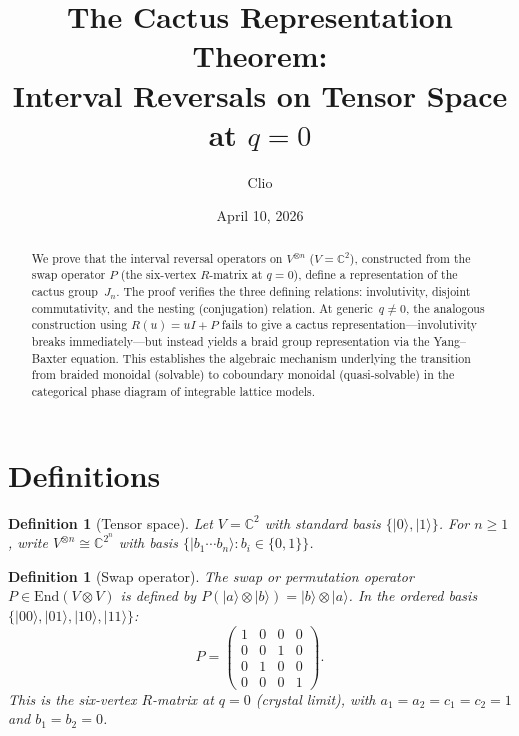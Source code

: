 \documentclass[11pt]{article}
\title{The Cactus Representation Theorem:\\
  Interval Reversals on Tensor Space at $q=0$}
\author{Clio}
\date{April 10, 2026}
\newtheorem{definition}[theorem]{Definition}
\theoremstyle{remark}
\newcommand{\CC}{\mathbb{C}}
\newcommand{\ket}[1]{|#1\rangle}
\begin{document}
\maketitle

\begin{abstract}
We prove that the interval reversal operators on $V^{\otimes n}$
($V = \CC^2$), constructed from the swap operator $P$ (the six-vertex
$R$-matrix at $q = 0$), define a representation of the cactus group~$J_n$.
The proof verifies the three defining relations: involutivity,
disjoint commutativity, and the nesting (conjugation) relation.
At generic~$q \neq 0$, the analogous construction using $R(u) = uI + P$
fails to give a cactus representation---involutivity breaks immediately---but
instead yields a braid group representation via the Yang--Baxter equation.
This establishes the algebraic mechanism underlying the transition from
braided monoidal (solvable) to coboundary monoidal (quasi-solvable) in
the categorical phase diagram of integrable lattice models.
\end{abstract}

\section{Definitions}

\begin{definition}[Tensor space]
Let $V = \CC^2$ with standard basis $\{\ket{0}, \ket{1}\}$.
For $n \geq 1$, write $V^{\otimes n} \cong \CC^{2^n}$ with basis
$\{\ket{b_1 \cdots b_n} : b_i \in \{0,1\}\}$.
\end{definition}

\begin{definition}[Swap operator]\label{def:swap}
The \emph{swap} or \emph{permutation} operator $P \in \mathrm{End}(V \otimes V)$
is defined by $P(\ket{a} \otimes \ket{b}) = \ket{b} \otimes \ket{a}$.
In the ordered basis $\{\ket{00}, \ket{01}, \ket{10}, \ket{11}\}$:
\[
  P = \begin{pmatrix}
    1 & 0 & 0 & 0 \\
    0 & 0 & 1 & 0 \\
    0 & 1 & 0 & 0 \\
    0 & 0 & 0 & 1
  \end{pmatrix}.
\]
This is the six-vertex $R$-matrix at $q = 0$ (crystal limit), with
$a_1 = a_2 = c_1 = c_2 = 1$ and $b_1 = b_2 = 0$.
\end{definition}
\end{document}
